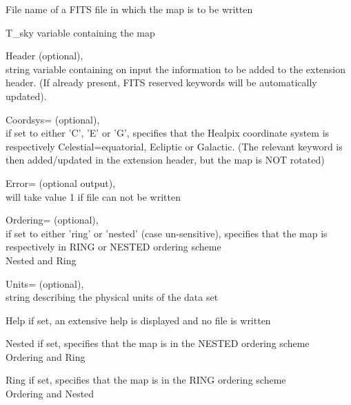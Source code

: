 \begin{qualifiers}
  \begin{qulist}{} %
 	\item[{File}]  
          name of a FITS file in which the map is to be written

 	\item[{T\_sky}]  
	variable containing the \healpix map

       \item[{Header}] 
		  (optional), \\
		string variable containing on input  the information to be added
		  to the extension header. (If already present, FITS reserved
		  keywords will be automatically updated).

       \item[{Coordsys=}] 
		  (optional), \\
		if set to either 'C', 'E' or 'G',  specifies that the
		Healpix coordinate system is respectively Celestial=equatorial,
		  Ecliptic or Galactic.
		(The relevant keyword is then added/updated in the extension
		  header, but the map is NOT rotated)

	\item[{Error=}] 
		(optional output), \\
		will take value 1 if file can not be written

	\item[{Ordering=}] 
		  (optional), \\
		if set to either 'ring' or 'nested' (case un-sensitive),
		  specifies that the map is respectively in RING or NESTED
		  ordering scheme\\
		\seealso Nested and Ring

	\item[{Units=}] 
		(optional), \\
		string describing the physical units of the data set
  \end{qulist}
\end{qualifiers}

\begin{keywords}
  \begin{kwlist}{} %
	\item[{Help}]  if set, an extensive help is displayed and no
	file is written
	\item[{Nested}]  if set, specifies that the map is in the NESTED ordering
	scheme\\
	\seealso Ordering and Ring 
	\item[{Ring}]  if set, specifies that the map is in the RING ordering
	scheme\\
	\seealso Ordering and Nested
   \end{kwlist}
\end{keywords}

